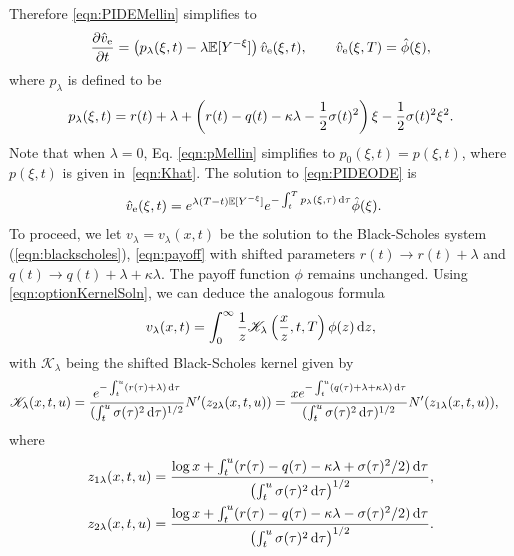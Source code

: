 Therefore \eqref{eqn:PIDEMellin} simplifies to
	\begin{equation}
		\label{eqn:PIDEODE}
		\frac{\partial \hat v_\text{e}}{\partial t} = \left( p_\lambda(\xi,t) - \lambda\mathbb{E}[Y^{-\xi}] \right)\hat v_\text{e}(\xi,t), \qquad \hat v_\text{e}(\xi,T) = \hat \phi(\xi),
	\end{equation}
where $p_\lambda$ is defined to be
	\begin{equation}
		\label{eqn:pMellin}
		p_\lambda(\xi,t) = r(t) + \lambda + \left( r(t) - q(t) - \kappa\lambda - \frac{1}{2}\sigma(t)^2 \right)\xi - \frac{1}{2}\sigma(t)^2\xi^2.
	\end{equation}
Note that when $\lambda = 0$, Eq. \eqref{eqn:pMellin} simplifies to $p_0(\xi,t) = p(\xi,t)$, where $p(\xi,t)$ is given in~\eqref{eqn:Khat}.
The solution to \eqref{eqn:PIDEODE} is
	\begin{align}
		\label{eqn:mellinSoln}
		\begin{split}
			\hat v_\text{e}(\xi,t) &= e^{\lambda(T-t)\mathbb{E}[Y^{-\xi}]}e^{-\int_t^T p_\lambda(\xi,\tau) \, \mathrm d \tau}\hat\phi(\xi).
		\end{split}
	\end{align}
To proceed, we let $v_\lambda = v_\lambda(x,t)$ be the solution to the Black-Scholes system (\ref{eqn:blackscholes}), \eqref{eqn:payoff} with shifted parameters
$r(t) \rightarrow r(t) + \lambda $ and $q(t) \rightarrow q(t) + \lambda + \kappa\lambda$. The payoff function $\phi$ remains unchanged. Using \eqref{eqn:optionKernelSoln}, we can deduce the analogous formula
	\begin{equation}
		\label{eqn:optionConv}
		v_{\lambda}(x,t) = \int_0^\infty \frac{1}{z}\mathscr{K}_\lambda\left( \frac{x}{z},t,T \right)\phi(z) \, \mathrm d z,
	\end{equation}
with $\mathscr{K}_\lambda$ being the shifted Black-Scholes kernel given by
	\begin{align}
		\label{eqn:shiftKernel}
		\begin{split}
		\mathscr{K}_\lambda(x,t,u) &= \frac{e^{-\int_t^u (r(\tau) + \lambda) \, \mathrm d \tau}}{(\int_t^u \sigma(\tau)^2 \, \mathrm d \tau)^{1/2}}N'(z_{2\lambda}(x,t,u)) = \frac{xe^{-\int_t^u (q(\tau) + \lambda + \kappa\lambda) \, \mathrm d \tau}}{(\int_t^u \sigma(\tau)^2 \, \mathrm d \tau)^{1/2}}N'(z_{1\lambda}(x,t,u)),
		\end{split}
	\end{align}
where
	\begin{align}
		\label{eqn:z1lambda}
		z_{1\lambda}(x,t,u) &= \frac{\log x + \int_t^u (r(\tau) - q(\tau) - \kappa\lambda + \sigma(\tau)^2/2) \, \mathrm d\tau}{\left( \int_t^u \sigma(\tau)^2 \, \mathrm d\tau \right)^{1/2}}, \\
		\label{eqn:z2lambda}
		z_{2\lambda}(x,t,u) &= \frac{\log x + \int_t^u (r(\tau) - q(\tau) - \kappa\lambda - \sigma(\tau)^2/2) \, \mathrm d\tau}{\left(\int_t^u \sigma(\tau)^2 \, \mathrm d \tau\right)^{1/2}}.
	\end{align}
